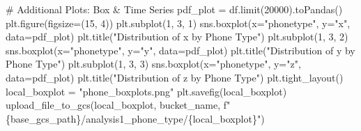 \documentclass[
  letterpaper,
  DIV=11,
  numbers=noendperiod]{scrartcl}
\newenvironment{Shaded}{\begin{snugshade}}{\end{snugshade}}
\newcommand{\CommentTok}[1]{\textcolor[rgb]{0.42,0.45,0.49}{#1}}
\newcommand{\DecValTok}[1]{\textcolor[rgb]{0.47,0.72,1.00}{#1}}
\newcommand{\NormalTok}[1]{\textcolor[rgb]{0.88,0.89,0.91}{#1}}
\newcommand{\OperatorTok}[1]{\textcolor[rgb]{0.88,0.89,0.91}{#1}}
\newcommand{\SpecialCharTok}[1]{\textcolor[rgb]{0.47,0.72,1.00}{#1}}
\newcommand{\SpecialStringTok}[1]{\textcolor[rgb]{0.62,0.80,1.00}{#1}}
\newcommand{\StringTok}[1]{\textcolor[rgb]{0.62,0.80,1.00}{#1}}
\begin{document}
\begin{Shaded}
\begin{Highlighting}[]
    \CommentTok{\# Additional Plots: Box \& Time Series}
\NormalTok{    pdf\_plot }\OperatorTok{=}\NormalTok{ df.limit(}\DecValTok{20000}\NormalTok{).toPandas()}
\NormalTok{    plt.figure(figsize}\OperatorTok{=}\NormalTok{(}\DecValTok{15}\NormalTok{, }\DecValTok{4}\NormalTok{))}
\NormalTok{    plt.subplot(}\DecValTok{1}\NormalTok{, }\DecValTok{3}\NormalTok{, }\DecValTok{1}\NormalTok{)}
\NormalTok{    sns.boxplot(x}\OperatorTok{=}\StringTok{"phonetype"}\NormalTok{, y}\OperatorTok{=}\StringTok{"x"}\NormalTok{, data}\OperatorTok{=}\NormalTok{pdf\_plot)}
\NormalTok{    plt.title(}\StringTok{"Distribution of x by Phone Type"}\NormalTok{)}
\NormalTok{    plt.subplot(}\DecValTok{1}\NormalTok{, }\DecValTok{3}\NormalTok{, }\DecValTok{2}\NormalTok{)}
\NormalTok{    sns.boxplot(x}\OperatorTok{=}\StringTok{"phonetype"}\NormalTok{, y}\OperatorTok{=}\StringTok{"y"}\NormalTok{, data}\OperatorTok{=}\NormalTok{pdf\_plot)}
\NormalTok{    plt.title(}\StringTok{"Distribution of y by Phone Type"}\NormalTok{)}
\NormalTok{    plt.subplot(}\DecValTok{1}\NormalTok{, }\DecValTok{3}\NormalTok{, }\DecValTok{3}\NormalTok{)}
\NormalTok{    sns.boxplot(x}\OperatorTok{=}\StringTok{"phonetype"}\NormalTok{, y}\OperatorTok{=}\StringTok{"z"}\NormalTok{, data}\OperatorTok{=}\NormalTok{pdf\_plot)}
\NormalTok{    plt.title(}\StringTok{"Distribution of z by Phone Type"}\NormalTok{)}
\NormalTok{    plt.tight\_layout()}
\NormalTok{    local\_boxplot }\OperatorTok{=} \StringTok{"phone\_boxplots.png"}
\NormalTok{    plt.savefig(local\_boxplot)}
\NormalTok{    upload\_file\_to\_gcs(local\_boxplot, bucket\_name, }\SpecialStringTok{f"}\SpecialCharTok{\{}\NormalTok{base\_gcs\_path}\SpecialCharTok{\}}\SpecialStringTok{/analysis1\_phone\_type/}\SpecialCharTok{\{}\NormalTok{local\_boxplot}\SpecialCharTok{\}}\SpecialStringTok{"}\NormalTok{)}


\end{Highlighting}
\end{Shaded}
\end{document}
